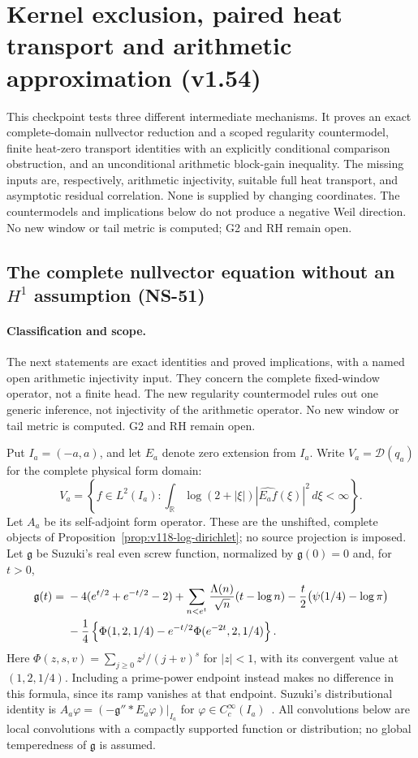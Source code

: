 \documentclass[11pt]{article}
\theoremstyle{remark}
\begin{document}
\section{Kernel exclusion, paired heat transport and arithmetic approximation (v1.54)}
\label{sec:v154-new-shapes}
This checkpoint tests three different intermediate mechanisms. It proves an
exact complete-domain nullvector reduction and a scoped regularity countermodel,
finite heat-zero transport identities with an explicitly conditional comparison
obstruction, and an unconditional arithmetic block-gain inequality. The missing
inputs are, respectively, arithmetic injectivity, suitable full heat transport,
and asymptotic residual correlation. None is supplied by changing coordinates.
The countermodels and implications below do not produce a negative Weil
direction. No new window or tail metric is computed; G2 and RH remain open.

\subsection*{The complete nullvector equation without an $H^1$ assumption (NS-51)}

\paragraph{Classification and scope.}
The next statements are exact identities and proved implications, with a
named open arithmetic injectivity input. They concern the complete
fixed-window operator, not a finite head. The new regularity countermodel
rules out one generic inference, not injectivity of the arithmetic
operator. No new window or tail metric is computed. G2 and RH remain open.

Put $I_a=(-a,a)$, and let $E_a$ denote zero extension from $I_a$.
Write $V_a=\mathcal D(q_a)$ for the complete physical form domain:
\[
 V_a=\left\{f\in L^2(I_a):
  \int_{\mathbb R}\log(2+|\xi|)|\widehat{E_af}(\xi)|^2\,d\xi<\infty\right\}.
\]
Let $A_a$ be its self-adjoint form operator. These are the unshifted,
complete objects of Proposition~\ref{prop:v118-log-dirichlet}; no source
projection is imposed. Let $\mathfrak g$ be Suzuki's real even screw
function, normalized by $\mathfrak g(0)=0$ and, for $t>0$,
\begin{align}
 \mathfrak g(t)={}&-4(e^{t/2}+e^{-t/2}-2)
  +\sum_{n<e^t}\frac{\Lambda(n)}{\sqrt n}(t-\log n)
  -\frac t2\bigl(\psi(1/4)-\log\pi\bigr)\notag\\
 &-\frac14\left\{\Phi(1,2,1/4)
             -e^{-t/2}\Phi(e^{-2t},2,1/4)\right\}.
 \label{eq:ns51-screw}
\end{align}
Here $\Phi(z,s,v)=\sum_{j\ge0}z^j/(j+v)^s$ for $|z|<1$,
with its convergent value at $(1,2,1/4)$. Including a prime-power
endpoint instead makes no difference in this formula, since its ramp
vanishes at that endpoint. Suzuki's distributional identity is
$A_a\varphi=(-\mathfrak g''*E_a\varphi)|_{I_a}$ for
$\varphi\in C_c^\infty(I_a)$~\cite[Sections 2.5 and 3]{Suzuki2026}.
All convolutions below are local convolutions with a compactly supported
function or distribution; no global temperedness of $\mathfrak g$ is
assumed.
\end{document}
